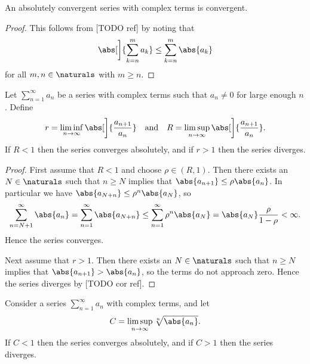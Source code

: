 \documentclass[article, a4paper, 11pt, oneside]{memoir}
\numberwithin{equation}{chapter}
\begin{document}
\begin{corollary}
    An absolutely convergent series with complex terms is convergent.
\end{corollary}

\begin{proof}
    This follows from [TODO ref] by noting that
    \begin{equation*}
        \abs[\bigg]{ \sum_{k=n}^m a_k }
            \leq \sum_{k=n}^m \abs{a_k}
    \end{equation*}
    for all $m,n \in \naturals$ with $m \geq n$.
\end{proof}


\begin{proposition}
    Let $\sum_{n=1}^\infty a_n$ be a series with complex terms such that $a_n \neq 0$ for large enough $n$. Define
    \begin{equation*}
        r
            = \liminf_{n \to \infty} \abs[\bigg]{ \frac{a_{n+1}}{a_n} }
        \quad \text{and} \quad
        R
            = \limsup_{n \to \infty} \abs[\bigg]{ \frac{a_{n+1}}{a_n} }.
    \end{equation*}
    If $R < 1$ then the series converges absolutely, and if $r > 1$ then the series diverges.
\end{proposition}

\begin{proof}
    First assume that $R < 1$ and choose $\rho \in (R,1)$. Then there exists an $N \in \naturals$ such that $n \geq N$ implies that $\abs{a_{n+1}} \leq \rho \abs{a_n}$. In particular we have $\abs{a_{N+n}} \leq \rho^n \abs{a_N}$, so
    \begin{equation*}
        \sum_{n=N+1}^\infty \abs{a_n}
            = \sum_{n=1}^\infty \abs{a_{N+n}}
            \leq \sum_{n=1}^\infty \rho^n \abs{a_N}
            = \abs{a_N} \frac{\rho}{1-\rho}
            < \infty.
    \end{equation*}
    Hence the series converges.

    Next assume that $r > 1$. Then there exists an $N \in \naturals$ such that $n \geq N$ implies that $\abs{a_{n+1}} > \abs{a_n}$, so the terms do not approach zero. Hence the series diverges by [TODO cor ref].
\end{proof}


\begin{proposition}
    Consider a series $\sum_{n=1}^\infty a_n$ with complex terms, and let
    \begin{equation*}
        C
            = \limsup_{n \to \infty} \sqrt[n]{\abs{a_n}}.
    \end{equation*}
    If $C < 1$ then the series converges absolutely, and if $C > 1$ then the series diverges.
\end{proposition}
\end{document}
